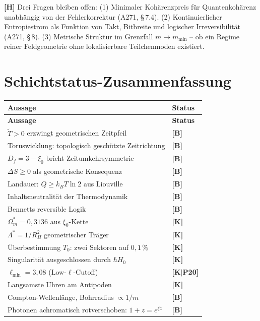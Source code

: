 \textbf{[H]} Drei Fragen bleiben offen:
(1) Minimaler Kohärenzpreis für Quantenkohärenz unabhängig von der
Fehlerkorrektur (A271, \S\,7.4).
(2) Kontinuierlicher Entropiestrom als Funktion von Takt, Bitbreite
und logischer Irreversibilität (A271, \S\,8).
(3) Metrische Struktur im Grenzfall $m \to m_\text{min}$ – ob
ein Regime reiner Feldgeometrie ohne lokalisierbare Teilchenmoden
existiert.

\section{Schichtstatus-Zusammenfassung}

\begin{center}
	\small
	\begin{longtable}{@{}p{}l@{}}
		\toprule
		\textbf{Aussage} & \textbf{Status} \\
		\midrule
		\endfirsthead
		\toprule
		\textbf{Aussage} & \textbf{Status} \\
		\midrule
		\endhead
		$\tilde{T} > 0$ erzwingt geometrischen Zeitpfeil & \textbf{[B]} \\
		Toruswicklung: topologisch geschützte Zeitrichtung & \textbf{[B]} \\
		$D_f = 3-\xi_0$ bricht Zeitumkehrsymmetrie & \textbf{[B]} \\
		$\Delta S \ge 0$ als geometrische Konsequenz & \textbf{[B]} \\
		Landauer: $Q \ge k_BT\ln 2$ aus Liouville & \textbf{[B]} \\
		Inhaltsneutralität der Thermodynamik & \textbf{[B]} \\
		Bennetts reversible Logik & \textbf{[B]} \\
		$\Omega_m^* = 0{,}3136$ aus $\xi_0$-Kette & \textbf{[K]} \\
		$\Lambda^* = 1/R_H^2$ geometrischer Träger & \textbf{[K]} \\
		Überbestimmung $T_0$: zwei Sektoren auf $0{,}1\,\%$ & \textbf{[K]} \\
		Singularität ausgeschlossen durch $\hbar H_0$ & \textbf{[K]} \\
		$\ell_\text{min} = 3{,}08$ (Low-$\ell$-Cutoff) & \textbf{[K$|$P20]} \\
		Langsamste Uhren am Antipoden & \textbf{[K]} \\
		Compton-Wellenlänge, Bohrradius $\propto 1/m$ & \textbf{[B]} \\
		Photonen achromatisch rotverschoben: $1+z = e^{\xi x}$ & \textbf{[B]} \\

\end{longtable}
\end{center}
